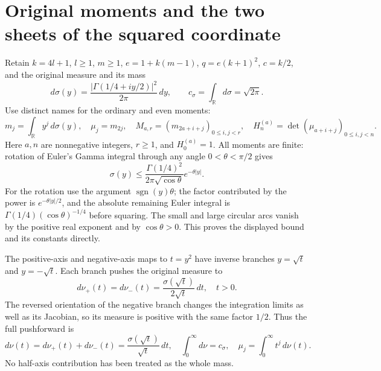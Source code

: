 \documentclass[11pt,a4paper]{article}
\begin{document}



\section{Original moments and the two sheets of the squared coordinate}

Retain $k=4l+1$, $l\geq1$, $m\geq1$,
$e=1+k(m-1)$, $q=e(k+1)^2$, $c=k/2$, and the original
measure and its mass
\[
 d\sigma(y)=\frac{|\Gamma(1/4+iy/2)|^2}{2\pi}\,dy,
 \qquad c_\sigma=\int_{\mathbb R}d\sigma=\sqrt{2\pi}.
\tag{PHT1}
\]
Use distinct names for the ordinary and even moments:
\[
 m_j=\int_{\mathbb R}y^j\,d\sigma(y),\quad
 \mu_j=m_{2j},\quad
 M_{a,r}=(m_{2a+i+j})_{0\leq i,j<r},\quad
 H_n^{(a)}=\det(\mu_{a+i+j})_{0\leq i,j<n}.
\tag{PHT2}
\]
Here $a,n$ are nonnegative integers, $r\geq1$, and
$H_0^{(a)}=1$. All moments are finite: rotation of Euler's
Gamma integral through any angle $0<\theta<\pi/2$ gives
\[
 \sigma(y)\leq\frac{\Gamma(1/4)^2}{2\pi\sqrt{\cos\theta}}
                         e^{-\theta|y|}.
\]
For the rotation use the argument $\operatorname{sgn}(y)\theta$;
the factor contributed by the power is $e^{-\theta|y|/2}$,
and the absolute remaining Euler integral is
$\Gamma(1/4)(\cos\theta)^{-1/4}$ before squaring.
The small and large circular arcs vanish by the positive
real exponent and by $\cos\theta>0$. This proves the displayed
bound and its constants directly.

The positive-axis and negative-axis maps to $t=y^2$ have
inverse branches $y=\sqrt t$ and $y=-\sqrt t$. Each branch
pushes the original measure to
\[
 d\nu_+(t)=d\nu_-(t)=\frac{\sigma(\sqrt t)}{2\sqrt t}\,dt,
 \quad t>0.
\]
The reversed orientation of the negative branch changes the
integration limits as well as its Jacobian, so its measure is
positive with the same factor $1/2$. Thus the full pushforward is
\[
 d\nu(t)=d\nu_+(t)+d\nu_-(t)
        =\frac{\sigma(\sqrt t)}{\sqrt t}\,dt,
 \quad\int_0^\infty d\nu=c_\sigma,
 \quad\mu_j=\int_0^\infty t^j\,d\nu(t).
\tag{PHT3}
\]
No half-axis contribution has been treated as the whole mass.
\end{document}
